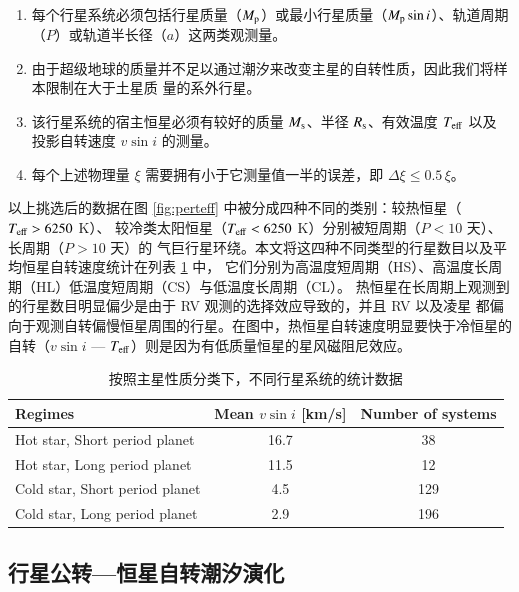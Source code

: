 \begin{enumerate}
\item 每个行星系统必须包括行星质量（$M_\mathrm{p}$）或最小行星质量（$M_\mathrm{p} \sin i$）、轨道周期
（$P$）或轨道半长径（$a$）这两类观测量。
\item 由于超级地球的质量并不足以通过潮汐来改变主星的自转性质，因此我们将样本限制在大于土星质
量的系外行星。
\item 该行星系统的宿主恒星必须有较好的质量 $M_\mathrm{s}$、半径 $R_\mathrm{s}$、有效温度 $T_\mathrm{eff}$ 以及
投影自转速度 $v \sin i$ 的测量。
\item 每个上述物理量 $\xi$ 需要拥有小于它测量值一半的误差，即 $\Delta \xi  \leq 0.5 \, \xi$。
\end{enumerate}

以上挑选后的数据在图 \ref{fig:perteff} 中被分成四种不同的类别：较热恒星（$T_\mathrm{eff} > 6250 $ K）、
较冷类太阳恒星（$T_\mathrm{eff} < 6250 $ K）分别被短周期（$P < 10 $ 天）、长周期（$P >10 $ 天）的
气巨行星环绕。本文将这四种不同类型的行星数目以及平均恒星自转速度统计在列表 \ref{tbl:stat} 中，
它们分别为高温度短周期（HS）、高温度长周期（HL）低温度短周期（CS）与低温度长周期（CL）。
热恒星在长周期上观测到的行星数目明显偏少是由于 RV 观测的选择效应导致的，并且 RV 以及凌星
都偏向于观测自转偏慢恒星周围的行星。在图中，热恒星自转速度明显要快于冷恒星的自转（$v\sin i$ 
--- $T_\mathrm{eff}$）则是因为有低质量恒星的星风磁阻尼效应\cite{Kraft1967}。

{\renewcommand{\arraystretch}{1.3}
\begin{table}[t]
\centering
\caption{按照主星性质分类下，不同行星系统的统计数据}
\label{tbl:stat}
\begin{tabularx}{0.9\textwidth}{@{\extracolsep{\fill}}lcc}
\toprule
Regimes &  Mean $v \sin i $ [km/s]  & Number of systems \\ \midrule 
Hot star, Short period planet   & 16.7       & 38                \\ 
Hot star, Long period planet    & 11.5       & 12                 \\ 
Cold star, Short period planet & 4.5         & 129               \\ 
Cold star, Long period planet  & 2.9        & 196                \\ \bottomrule
\end{tabularx}
\end{table}
}

\subsection{行星公转---恒星自转潮汐演化} \label{sec:obliquityevo}

